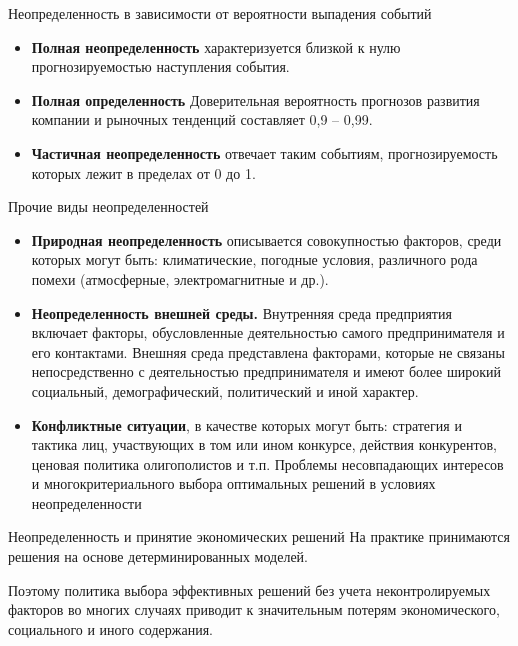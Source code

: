 \documentclass[_fin_decisions_lectures.tex]{subfiles}
\begin{document}
\begin{frame}[allowframebreaks]{Неопределенность в зависимости от вероятности выпадения событий}
\begin{itemize}
\item
\textbf{Полная неопределенность }характеризуется близкой к нулю прогнозируемостью наступления события.
\pagebreak
\item
\textbf{Полная определенность} Доверительная вероятность  прогнозов развития компании и рыночных тенденций составляет 0,9 – 0,99.
\pagebreak
\item
\textbf{Частичная неопределенность }отвечает таким событиям, прогнозируемость которых лежит в пределах от 0 до 1.
\end{itemize}
\end{frame}

\begin{frame}[allowframebreaks]{Прочие виды неопределенностей}
\begin{itemize}
\item
\textbf{Природная неопределенность }описывается совокупностью факторов, среди которых могут быть: климатические, погодные условия, различного рода помехи (атмосферные, электромагнитные и др.).
\pagebreak
\item
\textbf{Неопределенность внешней среды.} Внутренняя среда предприятия включает факторы, обусловленные деятельностью самого предпринимателя и его контактами. Внешняя среда представлена факторами, которые не связаны непосредственно с деятельностью предпринимателя и имеют более широкий социальный, демографический, политический и иной характер.
\pagebreak
\item
\textbf{Конфликтные ситуации}, в качестве которых могут быть: стратегия и тактика лиц, участвующих в том или ином конкурсе, действия конкурентов, ценовая политика олигополистов и т.п. Проблемы несовпадающих интересов и многокритериального выбора оптимальных решений в условиях неопределенности
\end{itemize}
\end{frame}

\begin{frame}{Неопределенность и принятие экономических решений}
На практике принимаются решения на основе детерминированных моделей. 

Поэтому политика выбора эффективных решений без учета неконтролируемых факторов во многих случаях приводит к значительным потерям экономического, социального и иного содержания.
\end{frame}
\end{document}
